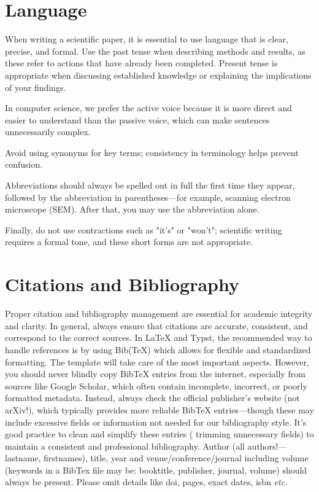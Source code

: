 \documentclass[sigconf,nonacm,screen]{acmart}
\begin{document}
\section{Language}
When writing a scientific paper, it is essential to use language that is clear, precise, and formal. Use the past tense when describing methods and results, as these refer to actions that have already been completed. Present tense is appropriate when discussing established knowledge or explaining the implications of your findings. 

In computer science, we prefer the active voice because it is more direct and easier to understand than the passive voice, which can make sentences unnecessarily complex. 

Avoid using synonyms for key terms; consistency in terminology helps prevent confusion. 

Abbreviations should always be spelled out in full the first time they appear, followed by the abbreviation in parentheses---for example, scanning electron microscope (SEM). After that, you may use the abbreviation alone.

Finally, do not use contractions such as "it's" or "won't"; scientific writing requires a formal tone, and these short forms are not appropriate.


\section{Citations and Bibliography}
Proper citation and bibliography management are essential for academic integrity and clarity. In general, always ensure that citations are accurate, consistent, and correspond to the correct sources. In LaTeX and Typst, the recommended way to handle references is by using Bib(TeX) which allows for flexible and standardized formatting. The template will take care of the most important aspects. However, you should never blindly copy BibTeX entries from the internet, especially from sources like Google Scholar, which often contain incomplete, incorrect, or poorly formatted metadata. Instead, always check the official publisher’s website (not arXiv!), which typically provides more reliable BibTeX entries---though these may include excessive fields or information not needed for our bibliography style. It’s good practice to clean and simplify these entries (\eg{} trimming unnecessary fields) to maintain a consistent and professional bibliography. Author (all authors!---lastname, firstnames), title, year and venue/conference/journal including volume (keywords in a BibTex file may be: booktitle, publisher, journal, volume) should always be present. Please omit details like doi, pages, exact dates, isbn \textit{etc.}
\end{document}

